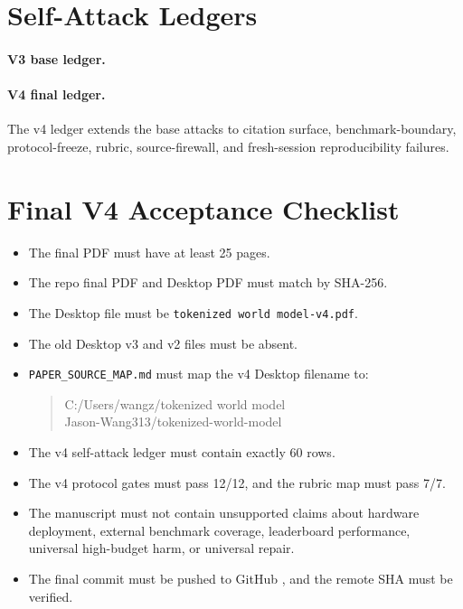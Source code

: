 \section{Self-Attack Ledgers}
\label{app:attack}

\paragraph{V3 base ledger.}


\paragraph{V4 final ledger.}
The v4 ledger extends the base attacks to citation surface, benchmark-boundary, protocol-freeze, rubric, source-firewall, and fresh-session reproducibility failures.



\section{Final V4 Acceptance Checklist}
\label{app:v4-final-checklist}

\begin{itemize}
\item The final PDF must have at least 25 pages.
\item The repo final PDF and Desktop PDF must match by SHA-256.
\item The Desktop file must be \mbox{\texttt{tokenized world model-v4.pdf}}.
\item The old Desktop v3 and v2 files must be absent.
\item \texttt{PAPER\_SOURCE\_MAP.md} must map the v4 Desktop filename to:
\begin{quote}
\ttfamily
C:/Users/wangz/tokenized world model\\
Jason-Wang313/tokenized-world-model
\end{quote}
\item The v4 self-attack ledger must contain exactly 60 rows.
\item The v4 protocol gates must pass 12/12, and the rubric map must pass 7/7.
\item The manuscript must not contain unsupported claims about hardware deployment, external benchmark coverage, leaderboard performance, universal high-budget harm, or universal repair.
\item The final commit must be pushed to GitHub , and the remote SHA must be verified.
\end{itemize}
